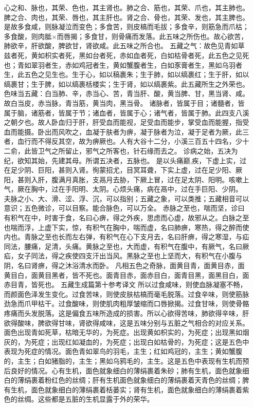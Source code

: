 \documentclass[a4paper,12pt,UTF8,twoside]{ctexbook}
\begin{document}
心之和、脉也，其荣、色也，其主肾也。肺之合、筋也，其荣、爪也，其主肺也。脾之合、肉也，其荣、唇也，其主肝也。肾之合、骨也，其荣、发也，其主脾也。
是故多食咸，则脉凝泣而变色；多食苦，则皮槁而毛拔；多食辛，则筋急而爪枯；多食酸，则肉胝×而唇揭；多食甘，则骨痛而发落。此五味之所伤也。故心欲苦，肺欲辛，肝欲酸，脾欲甘，肾欲咸。此五味之所合也。
五藏之气：故色见青如草兹者死，黄如枳实者死，黑如台者死，赤如血者死，白如枯骨者死，此五色之见死也；青如翠羽者生，赤如鸡冠者生，黄如蟹腹者生，白如豕膏者生，黑如乌羽者生，此五色之见生也。生于心，如以稿裹朱；生于肺，如以缟裹红；生于肝，如以缟裹甘；生于脾，如以缟裹栝楼实；生于肾，如以缟裹紫。此五藏所生之外荣也。
色味当五藏：白当肺、辛，赤当心、苦，青当肝、酸，黄当脾、甘，黑当肾、咸。故白当皮，赤当脉，青当筋，黄当肉，黑当骨。
诸脉者，皆属于目；诸髓者，皆属于脑，诸筋者，皆属于节；诸血者，皆属于心；诸气者，皆属于肺。此四支八溪之朝夕也。故人卧血归于肝，肝受血而能视，足受血而能步，掌受血而能握，指受血而能摄。卧出而风吹之，血凝于肤者为痹，凝于脉者为泣，凝于足者为厥，此三者，血行而不得反其空，故为痹厥也。人有大谷十二分，小溪三百五十四名，少十二俞，此皆卫气之所留止，邪气之所客也，针石缘而去之。
诊病之始，五决为纪，欲知其始，先建其母。所谓五决者，五脉也。
是以头痛巅,疾，下虚上实，过在足少阴、巨阳，甚则入肾。徇蒙招尤，目冥耳聋，下实上虚，过在足少阳、厥阳，甚则入肝，腹满月真胀，支鬲月去胁，下厥上冒，过在足太阴、阳明。咳嗽上气，厥在胸中，过在手阳明、太阴。心烦头痛，病在鬲中，过在手巨阳、少阴。
夫脉之小、大、滑、涩、浮、沉，可以指别；五藏之象，可以类推；五藏相音可以意识；五色微诊，可以目察。能合脉色，可以万全。
赤脉之至也，喘而坚，诊曰有积气在中，时害于食，名曰心痹，得之外疾，思虑而心虚，故邪从之。白脉之至也喘而浮，上虚下实，惊，有积气在胸中，喘而虚，名曰肺痹，寒热，得之醉而使内也。青脉之至也长而左右弹，有积气在心下支月去，名曰肝痹，得之寒湿，与疝同法，腰痛，足清，头痛。黄脉之至也，大而虚，有积气在腹中，有厥气，名曰厥疝，女子同法，得之疾使四支汗出当风。黑脉之至也上坚而大，有积气在小腹与阴，名曰肾痹，得之沐浴清水而卧。
凡相五色之奇脉，面黄目青，面黄目赤，面黄目白，面黄目黑者，皆不死也。面青目赤，面赤目白，面青目黑，面黑目白，面赤目青，皆死也。
五藏生成篇第十参考译文
所以过食咸味，则使血脉凝塞不畅，而颜面色泽发生变化。过食苦味，则使皮肤枯槁而毫毛脱落。过食辛味，则使筋脉劲急而爪甲枯干。过食酸味，则使肌肉粗厚皱缩而口唇掀揭。过食甘味，则使骨骼疼痛而头发脱落。这是偏食五味所造成的损害。所以心欲得苦味，肺欲得辛味，肝欲得酸味，脾欲得甘味，肾欲得咸味，这是五味分别与五脏之气相合的对应关系。
面色出现青如死草，枯暗无华的，为死症。出现黄如枳实的，为死症；出现黑如烟灰的，为死症；出现红如凝血的，为死症；出现白如枯骨的，为死症；这是五色中表现为死症的情况。面色青如翠鸟的羽毛，主生；红如鸡冠的，主生；黄如蟹腹的，主生；白如猪脂的，主生；黑如乌鸦毛的，主生。这是五色中表现有生机而预后良好的情况。心有生机，面色就象细白的薄绢裹着朱砂；肺有生机，面色就象细白的薄绢裹着粉红色的丝绸；肝有生机面色就象细白的薄绢裹着天青色的丝绸；脾有生机，面色就象细白的薄绢裹着栝蒌实；肾有生机，面色就象细白的薄绢裹着紫色的丝绸。这些都是五脏的生机显露于外的荣华。
\end{document}
